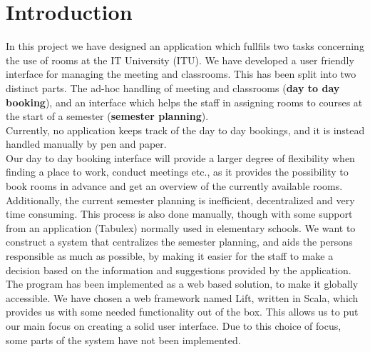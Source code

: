 \section{Introduction}
In this project we have designed an application which fullfils two tasks concerning the use of rooms at the IT University (ITU). We have developed a user friendly interface for managing the meeting and classrooms. This has been split into two distinct parts. The ad-hoc handling of meeting and classrooms (\textbf{day to day booking}), and an interface which helps the staff in assigning rooms to courses at the start of a semester (\textbf{semester planning}).\\

Currently, no application keeps track of the day to day bookings, and it is instead handled manually by pen and paper.\\
Our day to day booking interface will provide a larger degree of flexibility when finding a place to work, conduct meetings etc., as it provides the possibility to book rooms in advance and get an overview of the currently available rooms.\\

Additionally, the current semester planning is inefficient, decentralized and very time consuming. This process is also done manually, though with some support from an application (Tabulex\cite{tabulex}) normally used in elementary schools.
We want to construct a system that centralizes the semester planning, and aids the persons responsible as much as possible, by making it easier for the staff to make a decision based on the information and suggestions provided by the application. \\

The program has been implemented as a web based solution, to make it globally accessible. We have chosen a web framework named Lift, written in Scala, which provides us with some needed functionality out of the box. This allows us to put our main focus on creating a solid user interface. Due to this choice of focus, some parts of the system have not been implemented.


